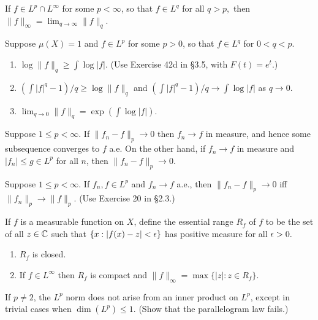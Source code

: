 \documentclass[12pt, a4paper]{article}
\begin{document}
\begin{problem}\label{prob:6-7}
If $f\in L^{p}\cap L^{\infty}$ for some $p<\infty$, so that $f\in L^{q}$ for all $q>p,$ then $\|f\|_{\infty}=\lim_{q\rightarrow\infty}\|f\|_{q}$.
\end{problem}

\begin{problem}\label{prob:6-8}
Suppose $\mu(X)=1$ and $f\in L^{p}$ for some $p>0$, so that $f\in L^{q}$ for $0<q<p.$
\begin{enumerate}[label=\alph*.]
\item $\log\|f\|_{q}\ge\int\log|f|$. (Use Exercise 42d in \S 3.5, with $F(t)=e^{t}$.)
\item $(\int|f|^{q}-1)/q\ge\log\|f\|_{q}$ and $(\int|f|^{q}-1)/q\rightarrow\int\log|f|$ as $q\rightarrow0$.
\item $\lim_{q\rightarrow0}\|f\|_{q}=\exp(\int\log|f|)$.
\end{enumerate}
\end{problem}

\begin{problem}\label{prob:6-9}
Suppose $1\le p<\infty$. If $\|f_{n}-f\|_{p}\rightarrow0$ then $f_{n}\rightarrow f$ in measure, and hence some subsequence converges to $f$ a.e. On the other hand, if $f_{n}\rightarrow f$ in measure and $|f_{n}|\le g\in L^{p}$ for all $n$, then $\|f_{n}-f\|_{p}\rightarrow0.$
\end{problem}

\begin{problem}\label{prob:6-10}
Suppose $1\le p<\infty$. If $f_{n},f\in L^{p}$ and $f_{n}\rightarrow f$ a.e., then $\|f_{n}-f\|_{p}\rightarrow0$ iff $\|f_{n}\|_{p}\rightarrow\|f\|_{p}$. (Use Exercise 20 in \S 2.3.)
\end{problem}

\begin{problem}\label{prob:6-11}
If $f$ is a measurable function on $X$, define the essential range $R_{f}$ of $f$ to be the set of all $z\in\mathbb{C}$ such that $\{x:|f(x)-z|<\epsilon\}$ has positive measure for all $\epsilon>0.$
\begin{enumerate}[label=\alph*.]
\item $R_{f}$ is closed.
\item If $f\in L^{\infty}$ then $R_{f}$ is compact and $\|f\|_{\infty}=\max\{|z|:z\in R_{f}\}$.
\end{enumerate}
\end{problem}

\begin{problem}\label{prob:6-12}
If $p\ne2$, the $L^{p}$ norm does not arise from an inner product on $L^{p}$, except in trivial cases when $\dim(L^{p})\le1.$ (Show that the parallelogram law fails.)
\end{problem}
\end{document}
